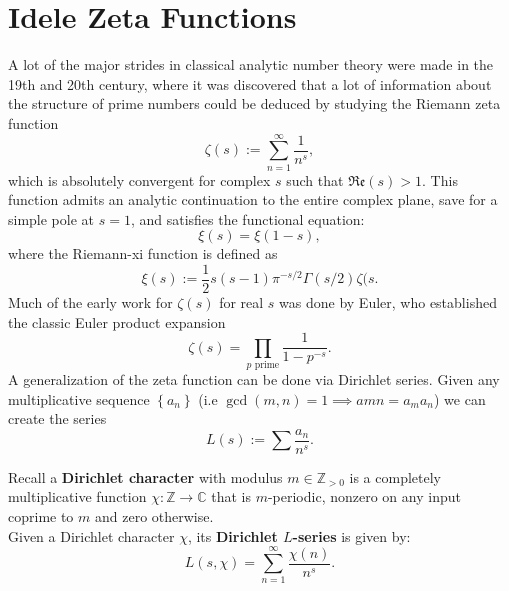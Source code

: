 \documentclass[11pt, x11names, openany]{book}
\newcommand{\zz}{\mathbb{Z}}
\newcommand{\cc}{\mathbb{C}}
\newcommand{\set}[1]{\left\{ #1 \right\}}
\newcommand{\re}[1]{\mathfrak{Re} \left( #1 \right)}
\begin{document}
\section{Idele Zeta Functions}
\label{section: Id\'ele Zeta Functions}
A lot of the major strides in classical analytic number theory were made in the 19th and 20th century, where it was discovered that a lot of information about the structure of prime numbers could be deduced by studying the Riemann zeta function
\begin{equation*}
    \zeta(s) := \sum^\infty_{n=1} \frac{1}{n^s},
\end{equation*}
which is absolutely convergent for complex $s$ such that $\re{s} > 1$. This function admits an analytic continuation to the entire complex plane, save for a simple pole at $s=1$, and satisfies the functional equation:
\begin{equation*}
    \xi(s) = \xi(1-s),
\end{equation*}
where the Riemann-xi function is defined as
\begin{equation*}
    \xi(s) := \frac{1}{2}s(s-1)\pi^{-s/2} \Gamma(s/2) \zeta(s.
\end{equation*}
Much of the early work for $\zeta(s)$ for real $s$ was done by Euler, who established the classic Euler product expansion
\begin{equation*}
    \zeta(s) = \prod_{p \text{ prime}} \frac{1}{1-p^{-s}}.
\end{equation*}
A generalization of the zeta function can be done via Dirichlet series. Given any multiplicative sequence $\set{a_n}$ (i.e $\gcd(m, n) = 1 \implies a{mn} = a_ma_n$) we can create the series 
\begin{equation*}
    L(s) := \sum \frac{a_n}{n^s}.
\end{equation*}

\begin{example}
\label{example: Dirichlet L-func}
    Recall a \textbf{Dirichlet character} with modulus $m \in \zz_{> 0}$ is a completely multiplicative function $\chi: \zz \to \cc$ that is $m$-periodic, nonzero on any input coprime to $m$ and zero otherwise.\\
    Given a Dirichlet character $\chi$, its \textbf{Dirichlet $L$-series} is given by:
    \begin{equation*}
        L(s, \chi) = \sum^\infty_{n=1} \frac{\chi(n)}{n^s}.
    \end{equation*}
\end{example}
\end{document}
